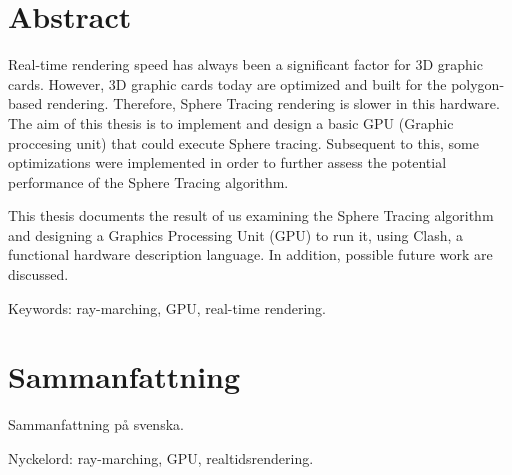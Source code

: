 \thispagestyle{plain}			%
\setlength{\parskip}{0pt plus 1.0pt}
\section*{Abstract}
	
	Real-time rendering speed has always been a significant factor for 3D
	graphic cards. However, 3D graphic cards today are optimized and built for
	the polygon-based rendering.  Therefore, Sphere Tracing rendering is slower
	in this hardware.  The aim of this thesis is to implement and design a
	basic GPU (Graphic proccesing unit) that could execute Sphere tracing.
	Subsequent to this, some optimizations were implemented in order to further
	assess the potential performance of the Sphere Tracing algorithm.
	
	This thesis documents the result of us examining the Sphere Tracing
	algorithm and designing a Graphics Processing Unit (GPU) to run it, using
	Clash, a functional hardware description language. In addition, possible
	future work are discussed.

	\vfill
	Keywords: ray-marching, GPU, real-time rendering.

\newpage
\thispagestyle{plain}

\section*{Sammanfattning}
	
	Sammanfattning på svenska.
	
	\vfill
	Nyckelord: ray-marching, GPU, realtidsrendering.


\newpage
\thispagestyle{empty}
\mbox{}
